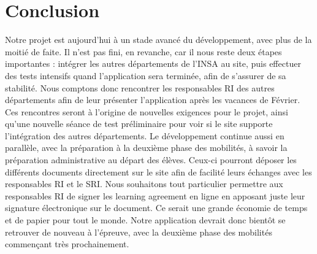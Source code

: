 \chapter{Conclusion}

Notre projet est aujourd'hui à un stade avancé du développement, avec plus de la moitié de faite. Il n'est pas fini, en revanche, car il nous reste deux étapes importantes : intégrer les autres départements de l'INSA au site, puis effectuer des tests intensifs quand l'application sera terminée, afin de s'assurer de sa stabilité.
\bigbreak
Nous comptons donc rencontrer les responsables RI des autres départements afin de leur présenter l'application après les vacances de Février. Ces rencontres seront à l'origine de nouvelles exigences pour le projet, ainsi qu'une nouvelle séance de test préliminaire pour voir si le site supporte l'intégration des autres départements. 
\bigbreak
Le développement continue aussi en parallèle, avec la préparation à la deuxième phase des mobilités, à savoir la préparation administrative au départ des élèves. Ceux-ci pourront déposer les différents documents directement sur le site afin de facilité leurs échanges avec les responsables RI et le SRI. Nous souhaitons tout particulier permettre aux responsables RI de signer les learning agreement en ligne en apposant juste leur signature électronique sur le document. Ce serait une grande économie de temps et de papier pour tout le monde. 
\bigbreak
Notre application devrait donc bientôt se retrouver de nouveau à l'épreuve, avec la deuxième phase des mobilités commençant très prochainement.